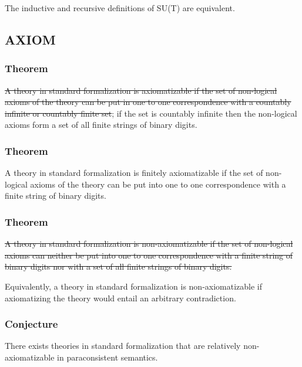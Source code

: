 The inductive and recursive definitions of SU(T) are equivalent.

\hypertarget{axiom}{%
\subsection{AXIOM}\label{axiom}}

\hypertarget{theorem-9}{%
\subsubsection{Theorem}\label{theorem-9}}

\st{A theory in standard formalization is axiomatizable if the set of
non-logical axioms of the theory can be put in one to one correspondence
with a countably infinite or countably finite set}; if the set is
countably infinite then the non-logical axioms form a set of all finite
strings of binary digits.

\hypertarget{theorem-10}{%
\subsubsection{Theorem}\label{theorem-10}}

A theory in standard formalization is finitely axiomatizable if the set
of non-logical axioms of the theory can be put into one to one
correspondence with a finite string of binary digits.

\hypertarget{theorem-11}{%
\subsubsection{Theorem}\label{theorem-11}}

\st{A theory in standard formalization is non-axiomatizable if the set
of non-logical axioms can neither be put into one to one correspondence
with a finite string of binary digits nor with a set of all finite
strings of binary digits.}

Equivalently, a theory in standard formalization is non-axiomatizable if
axiomatizing the theory would entail an arbitrary contradiction.

\hypertarget{conjecture-2}{%
\subsubsection{Conjecture}\label{conjecture-2}}

There exists theories in standard formalization that are relatively
non-axiomatizable in paraconsistent semantics.

